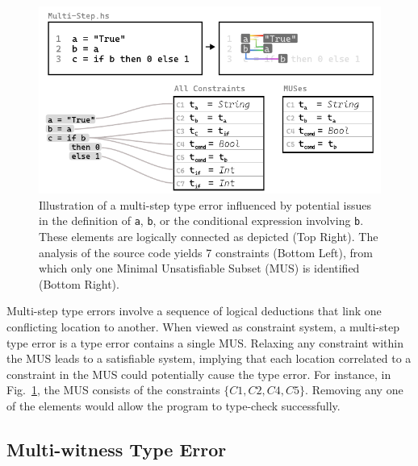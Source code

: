 \begin{figure}[hbt]
  \centering \includegraphics[width=\linewidth]{Multi-Step-MUS}
  \caption[Illustration of a multi-step type error in the context of MUSes]{Illustration of a multi-step type error influenced by potential issues in the definition of \texttt{a}, \texttt{b}, or the conditional expression involving \texttt{b}. These elements are logically connected as depicted (Top Right). The analysis of the source code yields 7 constraints (Bottom Left), from which only one Minimal Unsatisfiable Subset (MUS) is identified (Bottom Right).}
  \label{fig:multi-step-2}
  \end{figure}


Multi-step type errors involve a sequence of logical deductions that link one conflicting location to another. When viewed as constraint system, a multi-step type error is a type error contains a single MUS. Relaxing any constraint within the MUS leads to a satisfiable system, implying that each location correlated to a constraint in the MUS could potentially cause the type error. For instance, in Fig.~\ref{fig:multi-step-2}, the MUS consists of the constraints $\{C1, C2, C4, C5\}$. Removing any one of the elements would allow the program to type-check successfully.

\subsection*{Multi-witness Type Error}

